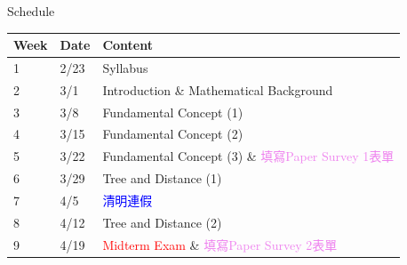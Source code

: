 \documentclass[aspectratio=169, 14pt, UTF8, t]{beamer}
\begin{document}
\begin{frame}{Schedule}
  \centering
  \begin{tabular}{llm{10cm}}
    \hline
    Week & Date & Content                                                                    \\ \hline
    1    & 2/23 & Syllabus                                                                   \\
    2    & 3/1  & Introduction \& Mathematical Background                                    \\
    3    & 3/8  & Fundamental Concept (1)                                                    \\
    4    & 3/15 & Fundamental Concept (2)                                                    \\
    5    & 3/22 & Fundamental Concept (3) \& \newline \textcolor{violet}{填寫Paper Survey 1表單} \\
    6    & 3/29 & Tree and Distance (1)                                                      \\
    7    & 4/5  & \textcolor{blue}{清明連假}                                                     \\
    8    & 4/12 & Tree and Distance (2)                                                      \\
    9    & 4/19 & \textcolor{red}{Midterm Exam} \& \textcolor{violet}{填寫Paper Survey 2表單}    \\ \hline
  \end{tabular}
\end{frame}
\end{document}
